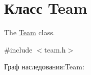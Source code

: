 \hypertarget{classTeam}{}\section{Класс Team}
\label{classTeam}


The \hyperlink{classTeam}{Team} class.  




{\ttfamily \#include $<$team.\+h$>$}



Граф наследования\+:Team\+:
